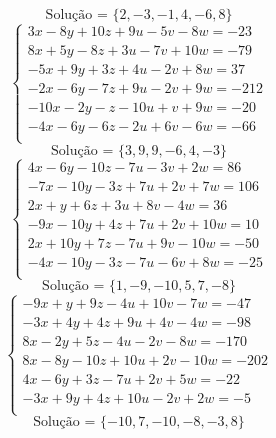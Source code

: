 \documentclass[12pt,oneside,a4paper]{article}
\begin{document}
\begin{equation*}
\text{Solução = }\{2,-3,-1,4,-6,8\}
\end{equation*}
\vspace{\baselineskip}
\begin{equation*}
\begin{cases}
3x-8y+10z+9u-5v-8w=-23 \\
8x+5y-8z+3u-7v+10w=-79 \\
-5x+9y+3z+4u-2v+8w=37 \\
-2x-6y-7z+9u-2v+9w=-212 \\
-10x-2y-z-10u+v+9w=-20 \\
-4x-6y-6z-2u+6v-6w=-66 \\
\end{cases}
\end{equation*}
\begin{equation*}
\text{Solução = }\{3,9,9,-6,4,-3\}
\end{equation*}
\vspace{\baselineskip}
\begin{equation*}
\begin{cases}
4x-6y-10z-7u-3v+2w=86 \\
-7x-10y-3z+7u+2v+7w=106 \\
2x+y+6z+3u+8v-4w=36 \\
-9x-10y+4z+7u+2v+10w=10 \\
2x+10y+7z-7u+9v-10w=-50 \\
-4x-10y-3z-7u-6v+8w=-25 \\
\end{cases}
\end{equation*}
\begin{equation*}
\text{Solução = }\{1,-9,-10,5,7,-8\}
\end{equation*}
\vspace{\baselineskip}
\begin{equation*}
\begin{cases}
-9x+y+9z-4u+10v-7w=-47 \\
-3x+4y+4z+9u+4v-4w=-98 \\
8x-2y+5z-4u-2v-8w=-170 \\
8x-8y-10z+10u+2v-10w=-202 \\
4x-6y+3z-7u+2v+5w=-22 \\
-3x+9y+4z+10u-2v+2w=-5 \\
\end{cases}
\end{equation*}
\begin{equation*}
\text{Solução = }\{-10,7,-10,-8,-3,8\}
\end{equation*}
\end{document}
